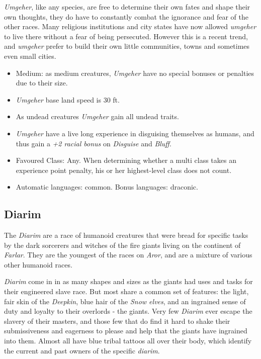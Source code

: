 \emph{Umgeher}, like any species, are free to determine their own fates and
shape their own thoughts, they do have to constantly combat the ignorance and
fear of the other races. Many religious institutions and city states have now
allowed \emph{umgeher} to live there without a fear of being persecuted.
However this is a recent trend, and \emph{umgeher} prefer to build their own
little communities, towns and sometimes even small cities.

\begin{35e}
  \begin{itemize}[noitemsep]
    \item Medium: as medium creatures, \emph{Umgeher} have no special bonuses or
    penalties due to their size.
    \item \emph{Umgeher} base land speed is 30 ft.
    \item As undead creatures \emph{Umgeher} gain all undead traits.
    \item \emph{Umgeher} have a live long experience in disguising themselves as
    humans, and thus gain a \emph{+2 racial bonus} on \emph{Disguise} and
    \emph{Bluff}.
    \item Favoured Class: Any. When determining whether a multi class takes an
    experience point penalty, his or her highest-level class does not count.
    \item Automatic languages: common. Bonus languages: draconic.
  \end{itemize}
\end{35e}

\subsection*{Diarim}


The \emph{Diarim} are a race of humanoid creatures that were bread for
specific tasks by the dark sorcerers and witches of the fire giants living on
the continent of \emph{Farlar}. They are the youngest of the races
on \emph{Aror}, and are a mixture of various other humanoid races.

\emph{Diarim} come in in as many shapes and sizes as the giants had uses and
tasks for their engineered slave race. But most share a common set of features:
the light, fair skin of the \emph{Deepkin}, blue hair of the \emph{Snow elves},
and an ingrained sense of duty and loyalty to their overlords - the giants. Very
few \emph{Diarim} ever escape the slavery of their masters, and those few that
do find it hard to shake their submissiveness and eagerness to please and help
that the giants have ingrained into them. Almost all have blue tribal tattoos
all over their body, which identify the current and past owners of the specific
\emph{diarim}.

